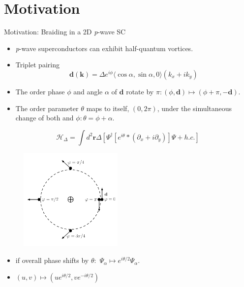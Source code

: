 \documentclass[xcolor=dvipsnames,10pt,aspectratio=169]{beamer}
\renewcommand{\vec}[1]{\mathbf{#1}}
\newcommand{\ham}{\mathcal{H}}
\newcommand{\MO}{Motivation}
\begin{document}
  \section{\MO}

  \begin{frame}{\MO: Braiding in a 2D \textit{p}-wave SC}
    \footnotesize
    \begin{multicols}{2}
      \begin{itemize}
        \item \textit{p}-wave superconductors can exhibit half-quantum vortices.
        \item Triplet pairing
          \begin{equation*}
            \vec{d}(\vec{k}) = \Delta e^{i\phi} \langle \cos \alpha, \sin \alpha, 0 \rangle(k_x + i k_y)
          \end{equation*}
        \item The order phase $\phi$ and angle $\alpha$ of $\vec{d}$ rotate by $\pi: (\phi,\vec{d}) \mapsto (\phi+\pi, -\vec{d})$.
        \item The order parameter $\theta$ maps to itself, $(0,2\pi)$, under the simultaneous change of both \vec{d} and $\phi: \theta = \phi+\alpha$.
      \end{itemize}
      \begin{equation*}
        \ham_{\Delta} = \int d^2\vec{r} \Delta \left[ \Psi^{\dagger} \left[ e^{i\theta} * (\partial_x + i\partial_y) \right] \Psi + h.c. \right]
      \end{equation*}

      \centering
      \begin{figure}
        \includegraphics[width=0.45\textwidth]{./figures/half-quantum-vortex.pdf}
      \end{figure}

      \begin{itemize}
        \item if overall phase shifts by $\theta:$ $\Psi_{\alpha} \mapsto e^{i\theta/2} \Psi_{\alpha}$.
        \item $(u,v) \mapsto (u e^{i\theta/2}, v e^{-i\theta/2})$
      \end{itemize}

    \end{multicols}
  \end{frame}
\end{document}

